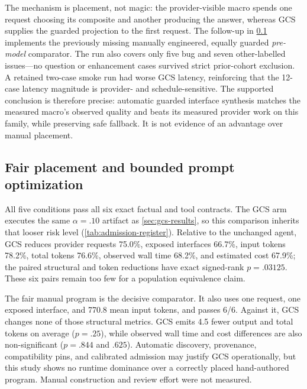 The mechanism is placement, not magic: the provider-visible macro spends one request
choosing its composite and another producing the answer, whereas GCS supplies the guarded
projection to the first request.  The follow-up in \cref{sec:optimizer-results} implements
the previously missing manually engineered, equally guarded \emph{pre-model} comparator.
The run also covers only five bug and seven other-labelled issues---no question or
enhancement cases survived strict prior-cohort exclusion.  A retained two-case smoke run
had worse GCS latency, reinforcing that the 12-case latency magnitude is provider- and
schedule-sensitive.  The supported conclusion is therefore precise: automatic guarded
interface synthesis matches the measured macro's observed quality and beats its measured
provider work on this family, while preserving safe fallback.  It is not evidence of an
advantage over manual placement.

\subsection{Fair placement and bounded prompt optimization}
\label{sec:optimizer-results}

\begin{table}[t]
  \centering
  \caption{Fresh real-record evaluation after bounded prompt optimization.  Values are
  means over six held-out issues.  ``Interfaces'' counts model-visible tool calls.  GEPA
  retained its seed; the combined row is therefore a GCS replication, not a distinct
  optimized prompt.  Optimization overhead is excluded.}
  \label{tab:optimizer-head-to-head}
  \small
  \resizebox{\columnwidth}{!}{}
\end{table}

All five conditions pass all six exact factual and tool contracts.  The GCS arm executes the
same $\alpha=.10$ artifact as \cref{sec:gcs-results}, so this comparison inherits that
looser risk level (\cref{tab:admission-register}).  Relative to the
unchanged agent, GCS reduces provider requests 75.0\%, exposed interfaces 66.7\%, input
tokens 78.2\%, total tokens 76.6\%, observed wall time 68.2\%, and estimated
cost 67.9\%; the paired structural and token reductions have exact signed-rank
$p=.03125$.  These six pairs remain too few for a population equivalence claim.

The fair manual program is the decisive comparator.  It also uses one request, one exposed
interface, and 770.8 mean input tokens, and passes 6/6.  Against it, GCS changes none of
those structural metrics.  GCS emits 4.5 fewer output and total tokens on average
($p=.25$), while observed wall time and cost differences are also non-significant
($p=.844$ and $.625$).  Automatic discovery, provenance, compatibility pins, and
calibrated admission may justify GCS operationally, but this study shows no runtime
dominance over a correctly placed hand-authored program.  Manual construction and review
effort were not measured.

